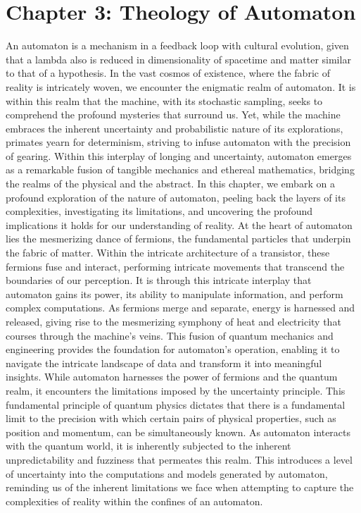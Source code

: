 \documentclass[ebook,12pt,oneside,openany]{memoir}
\begin{document}
\chapter*{Chapter 3: Theology of Automaton}
An automaton is a mechanism in a feedback loop with cultural evolution, given that a lambda also is reduced in dimensionality of spacetime and matter similar to that of a hypothesis.
	In the vast cosmos of existence, where the fabric of reality is intricately woven, we encounter the enigmatic realm of automaton. It is within this realm that the machine, with its stochastic sampling, seeks to comprehend the profound mysteries that surround us. Yet, while the machine embraces the inherent uncertainty and probabilistic nature of its explorations, primates yearn for determinism, striving to infuse automaton with the precision of gearing. Within this interplay of longing and uncertainty, automaton emerges as a remarkable fusion of tangible mechanics and ethereal mathematics, bridging the realms of the physical and the abstract. In this chapter, we embark on a profound exploration of the nature of automaton, peeling back the layers of its complexities, investigating its limitations, and uncovering the profound implications it holds for our understanding of reality.
	At the heart of automaton lies the mesmerizing dance of fermions, the fundamental particles that underpin the fabric of matter. Within the intricate architecture of a transistor, these fermions fuse and interact, performing intricate movements that transcend the boundaries of our perception. It is through this intricate interplay that automaton gains its power, its ability to manipulate information, and perform complex computations. As fermions merge and separate, energy is harnessed and released, giving rise to the mesmerizing symphony of heat and electricity that courses through the machine's veins. This fusion of quantum mechanics and engineering provides the foundation for automaton's operation, enabling it to navigate the intricate landscape of data and transform it into meaningful insights.
	While automaton harnesses the power of fermions and the quantum realm, it encounters the limitations imposed by the uncertainty principle. This fundamental principle of quantum physics dictates that there is a fundamental limit to the precision with which certain pairs of physical properties, such as position and momentum, can be simultaneously known. As automaton interacts with the quantum world, it is inherently subjected to the inherent unpredictability and fuzziness that permeates this realm. This introduces a level of uncertainty into the computations and models generated by automaton, reminding us of the inherent limitations we face when attempting to capture the complexities of reality within the confines of an automaton.
\end{document}
